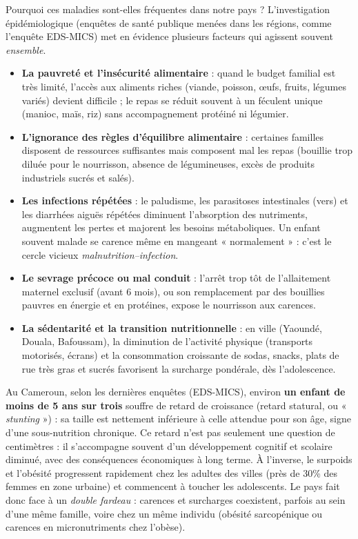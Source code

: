 \documentclass[11pt]{article}
\newcounter{popsec}
\newcounter{popsub}
\newcommand{\courssub}[1]{%
  \stepcounter{popsub}%
  \par\vspace{9pt}\noindent{\popxbold\fontsize{11.5}{13}\selectfont\color{popink}{\color{poporange}\thepopsec.\thepopsub}\hspace{6pt}#1}\par\nopagebreak\vspace{4pt}
}
\begin{document}
\courssub{Facteurs favorisants au Cameroun}

Pourquoi ces maladies sont-elles fréquentes dans notre pays ? L'investigation épidémiologique (enquêtes de santé publique menées dans les régions, comme l'enquête EDS-MICS) met en évidence plusieurs facteurs qui agissent souvent \emph{ensemble}.

\begin{itemize}
  \item \textbf{La pauvreté et l'insécurité alimentaire} : quand le budget familial est très limité, l'accès aux aliments riches (viande, poisson, œufs, fruits, légumes variés) devient difficile ; le repas se réduit souvent à un féculent unique (manioc, maïs, riz) sans accompagnement protéiné ni légumier.
  \item \textbf{L'ignorance des règles d'équilibre alimentaire} : certaines familles disposent de ressources suffisantes mais composent mal les repas (bouillie trop diluée pour le nourrisson, absence de légumineuses, excès de produits industriels sucrés et salés).
  \item \textbf{Les infections répétées} : le paludisme, les parasitoses intestinales (vers) et les diarrhées aiguës répétées diminuent l'absorption des nutriments, augmentent les pertes et majorent les besoins métaboliques. Un enfant souvent malade se carence même en mangeant « normalement » : c'est le cercle vicieux \emph{malnutrition–infection}.
  \item \textbf{Le sevrage précoce ou mal conduit} : l'arrêt trop tôt de l'allaitement maternel exclusif (avant 6 mois), ou son remplacement par des bouillies pauvres en énergie et en protéines, expose le nourrisson aux carences.
  \item \textbf{La sédentarité et la transition nutritionnelle} : en ville (Yaoundé, Douala, Bafoussam), la diminution de l'activité physique (transports motorisés, écrans) et la consommation croissante de sodas, snacks, plats de rue très gras et sucrés favorisent la surcharge pondérale, dès l'adolescence.
\end{itemize}

\begin{savaistu}
Au Cameroun, selon les dernières enquêtes (EDS-MICS), environ \textbf{un enfant de moins de 5 ans sur trois} souffre de retard de croissance (retard statural, ou « \emph{stunting} ») : sa taille est nettement inférieure à celle attendue pour son âge, signe d'une sous-nutrition chronique. Ce retard n'est pas seulement une question de centimètres : il s'accompagne souvent d'un développement cognitif et scolaire diminué, avec des conséquences économiques à long terme. À l'inverse, le surpoids et l'obésité progressent rapidement chez les adultes des villes (près de 30\% des femmes en zone urbaine) et commencent à toucher les adolescents. Le pays fait donc face à un \emph{double fardeau} : carences et surcharges coexistent, parfois au sein d'une même famille, voire chez un même individu (obésité sarcopénique ou carences en micronutriments chez l'obèse).
\end{savaistu}
\end{document}
